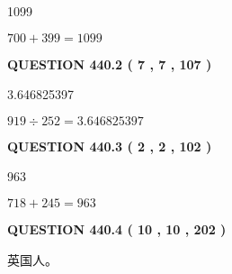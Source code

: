 \documentclass{ctexart}
\begin{document}
  
 
 
\noindent{}

1099
 
 
 
 
\noindent{}

$ %
700 +  %
399=   %
1099$
 
 
  
\vspace{0.2in}
  
{\textbf{\Large{QUESTION
440.2 
 ( 7 , 7 , 107 )
}}}
  
  
 
 
\noindent{}

3.646825397
 
 
 
 
\noindent{}

$ %
919 \div  %
252=   %
3.646825397$
 
 
  
\vspace{0.2in}
  
{\textbf{\Large{QUESTION
440.3 
 ( 2 , 2 , 102 )
}}}
  
  
 
 
\noindent{}

963
 
 
 
 
\noindent{}

$ %
718 +  %
245=   %
963$
 
 
  
\vspace{0.2in}
  
{\textbf{\Large{QUESTION
440.4 
 ( 10 , 10 , 202 )
}}}
  
  
 
 
\noindent{}
 
 
英国人。
 
 
 
 
  
\vspace{0.2in}
  
\end{document}
